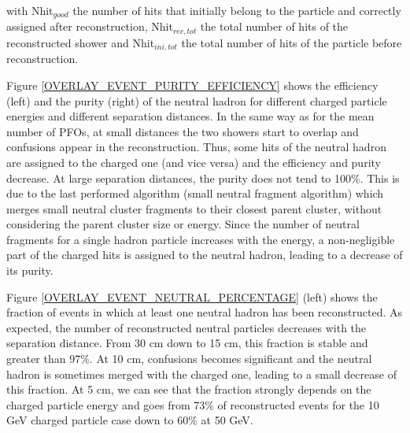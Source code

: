 \documentclass[cits]{JINST}
\begin{document}
with Nhit$_{good}$ the number of hits that initially belong to the particle and correctly assigned after reconstruction, Nhit$_{rec,tot}$ the total number of hits of the reconstructed shower and Nhit$_{ini,tot}$ the total number of hits of the particle before reconstruction. 

Figure \ref{OVERLAY_EVENT_PURITY_EFFICIENCY} shows the efficiency (left) and the purity (right) of the neutral hadron for different charged particle energies and different separation distances. In the same way as for the mean number of PFOs, at small distances the two showers start to overlap and confusions appear in the reconstruction. Thus, some hits of the neutral hadron are assigned to the charged one (and vice versa) and the efficiency and purity decrease. At large separation distances, the purity does not tend to 100\%. This is due to the last performed algorithm (small neutral fragment algorithm) which merges small neutral cluster fragments to their closest parent cluster, without considering the parent cluster size or energy. Since the number of neutral fragments for a single hadron particle increases with the energy, a non-negligible part of the charged hits is assigned to the neutral hadron, leading to a decrease of its purity.

Figure \ref{OVERLAY_EVENT_NEUTRAL_PERCENTAGE} (left) shows the fraction of events in which at least one neutral hadron has been reconstructed. As expected, the number of reconstructed neutral particles decreases with the separation distance. From 30 cm down to 15 cm, this fraction is stable and greater than 97\%. At 10 cm, confusions becomes significant and the neutral hadron is sometimes merged with the charged one, leading to a small decrease of this fraction. At 5 cm, we can see that the fraction strongly depends on the charged particle energy and goes from 73\% of reconstructed events for the 10 GeV charged particle case down to 60\% at 50 GeV.
\end{document}
